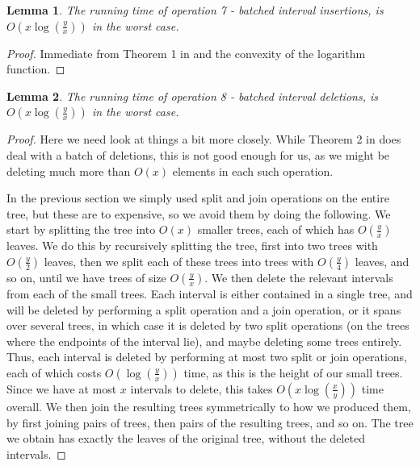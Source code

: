 \documentclass[11pt,a4paper]{article}
\newtheorem{lemma}{Lemma}
\theoremstyle{definition}
\theoremstyle{remark}
\begin{document}
\begin{lemma}
The running time of operation 7 - batched interval insertions, is $O(x \log (\frac{y}{x}))$ in the worst case.
\end{lemma}
\begin{proof}
Immediate from Theorem 1 in %
and the convexity of the logarithm function.
\end{proof}

\begin{lemma}
The running time of operation 8 - batched interval deletions, is $O(x \log (\frac{y}{x}))$ in the worst case.
\end{lemma}
\begin{proof}
Here we need look at things a bit more closely. While Theorem 2 in %
does deal with a batch of deletions, this is not good enough for us, as we might be deleting much more than $O(x)$ elements in each such operation. 

In the previous section we simply used split and join operations on the entire tree, but these are to expensive, so we avoid them by doing the following. We start by splitting the tree into $O(x)$ smaller trees, each of which has $O(\frac{y}{x})$ leaves. We do this by recursively splitting the tree, first into two trees with $O(\frac{y}{2})$ leaves, then we split each of these trees into trees with $O(\frac{y}{4})$ leaves, and so on, until we have trees of size $O(\frac{y}{x})$. We then delete the relevant intervals from each of the small trees. Each interval is either contained in a single tree, and will be deleted by performing a split operation and a join operation, or it spans over several trees, in which case it is deleted by two split operations (on the trees where the endpoints of the interval lie), and maybe deleting some trees entirely. Thus, each interval is deleted by performing at most two split or join operations, each of which costs $O(\log (\frac{y}{x}))$ time, as this is the height of our small trees. Since we have at most $x$ intervals to delete, this takes $O(x \log(\frac{x}{y}))$ time overall. We then join the resulting trees symmetrically to how we produced them, by first joining pairs of trees, then pairs of the resulting trees, and so on. The tree we obtain has exactly the leaves of the original tree, without the deleted intervals.


\end{proof}
\end{document}
